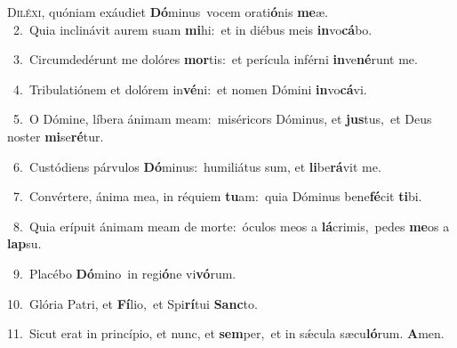 \lettrine{\initial\textcolor{\initialcolor}{D}}{iléxi,} quóniam exáudiet \textbf{Dó}\-minus~\star vocem orati\-\textbf{ó}\-nis \textbf{me}\-æ.\\
{\numbfont\textcolor{\numbcolor}{~2.}}~Quia inclinávit aurem suam \textbf{mi}\-hi:~\star et in diébus meis \textbf{in}\-vo\-\textbf{cá}\-bo.\par
{\numbfont\textcolor{\numbcolor}{~3.}}~Circumdedérunt me dolóres \textbf{mor}\-tis:~\star et perícula inférni \textbf{in}\-ve\-\textbf{né}\-runt me.\par
{\numbfont\textcolor{\numbcolor}{~4.}}~Tribulatiónem et dolórem in\-\textbf{vé}\-ni:~\star et nomen Dómini \textbf{in}\-vo\-\textbf{cá}\-vi.\par
{\numbfont\textcolor{\numbcolor}{~5.}}~O Dómine, líbera ánimam meam:~\dagger miséricors Dóminus, et \textbf{jus}\-tus,~\star et Deus noster \textbf{mi}\-se\-\textbf{ré}\-tur.\par
{\numbfont\textcolor{\numbcolor}{~6.}}~Custódiens párvulos \textbf{Dó}\-minus:~\star humiliátus sum, et \textbf{li}\-be\-\textbf{rá}\-vit me.\par
{\numbfont\textcolor{\numbcolor}{~7.}}~Convértere, ánima mea, in réquiem \textbf{tu}\-am:~\star quia Dóminus bene\-\textbf{fé}\-cit \textbf{ti}\-bi.\par
{\numbfont\textcolor{\numbcolor}{~8.}}~Quia erípuit ánimam meam de morte:~\dagger óculos meos a \textbf{lá}\-crimis,~\star pedes \textbf{me}\-os a \textbf{lap}\-su.\par
{\numbfont\textcolor{\numbcolor}{~9.}}~Placébo \textbf{Dó}\-mino~\star in regi\-\textbf{ó}\-ne vi\-\textbf{vó}\-rum.\par
{\numbfont\textcolor{\numbcolor}{10.}}~Glória Patri, et \textbf{Fí}\-lio,~\star et Spi\-\textbf{rí}\-tui \textbf{Sanc}\-to.\par
{\numbfont\textcolor{\numbcolor}{11.}}~Sicut erat in princípio, et nunc, et \textbf{sem}\-per,~\star et in sǽcula sæcu\-\textbf{ló}\-rum. \textbf{A}\-men.\par
